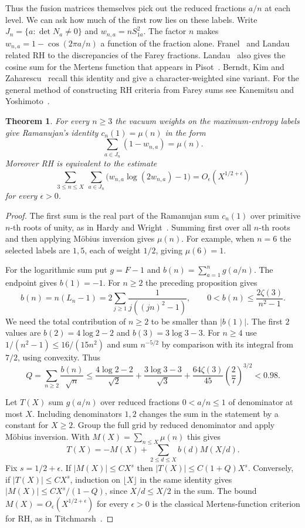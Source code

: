 \documentclass[11pt,a4paper]{article}
\newtheorem{thm}{Theorem}[section]
\begin{document}
Thus the fusion matrices themselves pick out the reduced fractions $a/n$ at each level. We can ask how much of the first row lies on these labels. Write $J_n=\{a:\det N_a\ne0\}$ and $w_{n,a}=nS_{1a}^2$. The factor $n$ makes $w_{n,a}=1-\cos(2\pi a/n)$ a function of the fraction alone. Franel~\cite{franel} and Landau~\cite{landau} related RH to the discrepancies of the Farey fractions. Landau~\cite{landau} also gives the cosine sum for the Mertens function that appears in Pisot~\cite{pisot}. Berndt, Kim and Zaharescu~\cite{bkz} recall this identity and give a character-weighted sine variant. For the general method of constructing RH criteria from Farey sums see Kanemitsu and Yoshimoto~\cite{ky-euler}.

\begin{samepage}
\begin{thm}\label{fusion-farey}
For every $n\geq3$ the vacuum weights on the maximum-entropy labels give Ramanujan's identity $c_n(1)=\mu(n)$ in the form
\[
 \sum_{a\in J_n}(1-w_{n,a})=\mu(n).
\]
Moreover RH is equivalent to the estimate
\[
 \sum_{3\leq n\leq X}\ \sum_{a\in J_n}
       \big(w_{n,a}\log(2w_{n,a})-1\big)
       =O_\epsilon(X^{1/2+\epsilon})
\]
for every $\epsilon>0$.
\end{thm}
\end{samepage}
\begin{proof}
The first sum is the real part of the Ramanujan sum $c_n(1)$ over primitive $n$-th roots of unity, as in Hardy and Wright~\cite{hw}. Summing first over all $n$-th roots and then applying M\"obius inversion gives $\mu(n)$. For example, when $n=6$ the selected labels are $1,5$, each of weight $1/2$, giving $\mu(6)=1$.

For the logarithmic sum put $g=F-1$ and $b(n)=\sum_{a=1}^n g(a/n)$. The endpoint gives $b(1)=-1$. For $n\geq2$ the preceding proposition gives
\[
 b(n)=n(L_n-1)=2\sum_{j\geq1}\frac1{j((jn)^2-1)},
 \qquad 0<b(n)\leq\frac{2\zeta(3)}{n^2-1}.
\]
We need the total contribution of $n\geq2$ to be smaller than $|b(1)|$. The first $2$ values are $b(2)=4\log2-2$ and $b(3)=3\log3-3$. For $n\geq4$ use $1/(n^2-1)\leq16/(15n^2)$ and sum $n^{-5/2}$ by comparison with its integral from $7/2$, using convexity. Thus
\[
 Q=\sum_{n\geq2}\frac{b(n)}{\sqrt n}
 \leq\frac{4\log2-2}{\sqrt2}+\frac{3\log3-3}{\sqrt3}
       +\frac{64\zeta(3)}{45}\left(\frac27\right)^{3/2}<0.98.
\]

Let $T(X)$ sum $g(a/n)$ over reduced fractions $0<a/n\leq1$ of denominator at most $X$. Including denominators $1,2$ changes the sum in the statement by a constant for $X\geq2$. Group the full grid by reduced denominator and apply M\"obius inversion. With $M(X)=\sum_{n\leq X}\mu(n)$ this gives
\[
 T(X)=-M(X)+\sum_{2\leq d\leq X}b(d)M(X/d).
\]
Fix $s=1/2+\epsilon$. If $|M(X)|\leq C X^s$ then $|T(X)|\leq C(1+Q)X^s$. Conversely, if $|T(X)|\leq C X^s$, induction on $\lfloor X\rfloor$ in the same identity gives $|M(X)|\leq C X^s/(1-Q)$, since $X/d\leq X/2$ in the sum. The bound $M(X)=O_\epsilon(X^{1/2+\epsilon})$ for every $\epsilon>0$ is the classical Mertens-function criterion for RH, as in Titchmarsh~\cite{titchmarsh}.
\end{proof}
\end{document}

